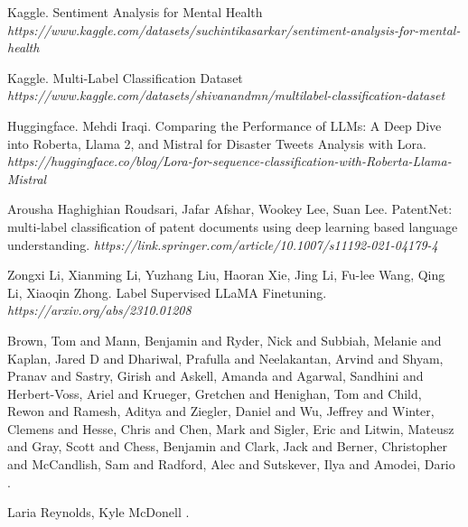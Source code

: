 \documentclass[11pt]{article}
\begin{document}

\begin{thebibliography}{}

Kaggle. Sentiment Analysis for Mental Health \textit{https://www.kaggle.com/datasets/suchintikasarkar/sentiment-analysis-for-mental-health}

Kaggle.
Multi-Label Classification Dataset \textit{https://www.kaggle.com/datasets/shivanandmn/multilabel-classification-dataset}

Huggingface.
Mehdi Iraqi. Comparing the Performance of LLMs: A Deep Dive into Roberta, Llama 2, and Mistral for Disaster Tweets Analysis with Lora.
\textit{https://huggingface.co/blog/Lora-for-sequence-classification-with-Roberta-Llama-Mistral}

Arousha Haghighian Roudsari, Jafar Afshar, Wookey Lee, Suan Lee.
PatentNet: multi‑label classification of patent documents
using deep learning based language understanding.
\textit{https://link.springer.com/article/10.1007/s11192-021-04179-4}

Zongxi Li, Xianming Li, Yuzhang Liu, Haoran Xie, Jing Li, Fu-lee Wang, Qing Li, Xiaoqin Zhong. Label Supervised LLaMA Finetuning.
\textit{https://arxiv.org/abs/2310.01208}

{Brown, Tom and Mann, Benjamin and Ryder, Nick and Subbiah, Melanie and Kaplan, Jared D and Dhariwal, Prafulla and Neelakantan, Arvind and Shyam, Pranav and Sastry, Girish and Askell, Amanda and Agarwal, Sandhini and Herbert-Voss, Ariel and Krueger, Gretchen and Henighan, Tom and Child, Rewon and Ramesh, Aditya and Ziegler, Daniel and Wu, Jeffrey and Winter, Clemens and Hesse, Chris and Chen, Mark and Sigler, Eric and Litwin, Mateusz and Gray, Scott and Chess, Benjamin and Clark, Jack and Berner, Christopher and McCandlish, Sam and Radford, Alec and Sutskever, Ilya and Amodei, Dario}
.

{Laria Reynolds, Kyle McDonell}
.


\end{thebibliography}
\end{document}
